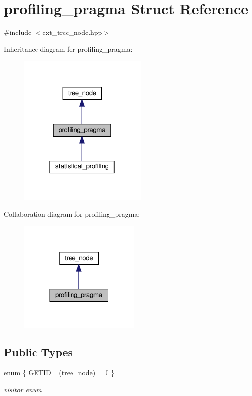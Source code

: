 \hypertarget{structprofiling__pragma}{}\section{profiling\+\_\+pragma Struct Reference}
\label{structprofiling__pragma}


{\ttfamily \#include $<$ext\+\_\+tree\+\_\+node.\+hpp$>$}



Inheritance diagram for profiling\+\_\+pragma\+:
\nopagebreak
\begin{figure}[H]
\begin{center}
\leavevmode
\includegraphics[width=178pt]{d5/d38/structprofiling__pragma__inherit__graph}
\end{center}
\end{figure}


Collaboration diagram for profiling\+\_\+pragma\+:
\nopagebreak
\begin{figure}[H]
\begin{center}
\leavevmode
\includegraphics[width=168pt]{d2/dc3/structprofiling__pragma__coll__graph}
\end{center}
\end{figure}
\subsection*{Public Types}
\begin{DoxyCompactItemize}
\item 
enum \{ \hyperlink{structprofiling__pragma_ac2a8a89c5169261ac20d41bdcfc350c7a37c6e3d25ab82e515f7fde6b57a631c5}{G\+E\+T\+ID} =(tree\+\_\+node) = 0
 \}\begin{DoxyCompactList}\small\item\em visitor enum \end{DoxyCompactList}
\end{DoxyCompactItemize}
